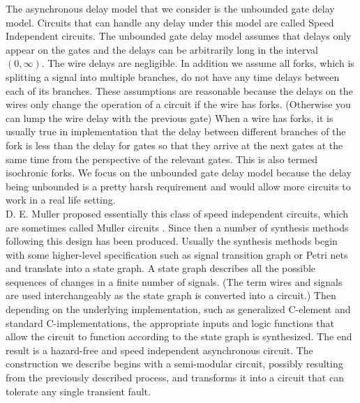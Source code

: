\documentclass[12pt]{report}
\begin{document}
The asynchronous delay model that we consider is the unbounded gate delay model.  Circuits that can handle any delay under this model are called Speed Independent circuits. The unbounded gate delay model assumes that delays only appear on the gates and the delays can be arbitrarily long in the interval $(0,\infty)$.  The wire delays are negligible.  In addition we assume all forks, which is splitting a signal into multiple branches, do not have any time delays between each of its branches.  These assumptions are reasonable because the delays on the wires only change the operation of a circuit if the wire has forks.  (Otherwise you can lump the wire delay with the previous gate)  When a wire has forks, it is usually true in implementation that the delay between different branches of the fork is less than the delay for gates so that they arrive at the next gates at the same time from the perspective of the relevant gates.  This is also termed isochronic forks.  We focus on the unbounded gate delay model because the delay being unbounded is a pretty harsh requirement and would allow more circuits to work in a real life setting. \\ %

D. E. Muller proposed essentially this class of speed independent circuits, which are sometimes called Muller circuits \cite{Muller_59}.  Since then a number of synthesis methods following this design has been produced.  Usually the synthesis methods begin with some higher-level specification such as signal transition graph or Petri nets and translate into a state graph.  A state graph describes all the possible sequences of changes in a finite number of signals.  (The term wires and signals are used interchangeably as the state graph is converted into a circuit.)  Then depending on the underlying implementation, such as generalized C-element and standard C-implementations, the appropriate inputs and logic functions that allow the circuit to function according to the state graph is synthesized.  The end result is a hazard-free and speed independent asynchronous circuit.  The construction we describe begins with a semi-modular circuit, possibly resulting from the previously described process, and transforms it into a circuit that can tolerate any single transient fault.
     
\end{document}
